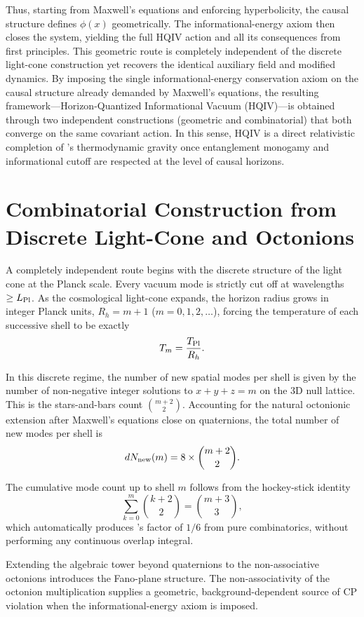 \documentclass[12pt,a4paper]{article}
\begin{document}
Thus, starting from Maxwell's equations and enforcing hyperbolicity, the causal structure defines $\phi(x)$ geometrically. The informational-energy axiom then closes the system, yielding the full HQIV action and all its consequences from first principles. This geometric route is completely independent of the discrete light-cone construction yet recovers the identical auxiliary field and modified dynamics. By imposing the single informational-energy conservation axiom on the causal structure already demanded by Maxwell's equations, the resulting framework---Horizon-Quantized Informational Vacuum (HQIV)---is obtained through two independent constructions (geometric and combinatorial) that both converge on the same covariant action. In this sense, HQIV is a direct relativistic completion of \citet{Jacobson1995}'s thermodynamic gravity once entanglement monogamy and informational cutoff are respected at the level of causal horizons.



\section{Combinatorial Construction from Discrete Light-Cone and Octonions}

A completely independent route begins with the discrete structure of the light cone at the Planck scale. Every vacuum mode is strictly cut off at wavelengths $\ge L_{\rm Pl}$. As the cosmological light-cone expands, the horizon radius grows in integer Planck units, $R_h = m + 1$ ($m = 0,1,2,\dots$), forcing the temperature of each successive shell to be exactly
\[
T_m = \frac{T_{\rm Pl}}{R_h}.
\]

In this discrete regime, the number of new spatial modes per shell is given by the number of non-negative integer solutions to $x+y+z = m$ on the 3D null lattice. This is the stars-and-bars count $\binom{m+2}{2}$. Accounting for the natural octonionic extension after Maxwell's equations close on quaternions, the total number of new modes per shell is
\[
dN_{\rm new}(m) = 8 \times \binom{m+2}{2}.
\]

The cumulative mode count up to shell $m$ follows from the hockey-stick identity
\[
\sum_{k=0}^{m} \binom{k+2}{2} = \binom{m+3}{3},
\]
which automatically produces \citet{brodie2026}'s factor of $1/6$ from pure combinatorics, without performing any continuous overlap integral.

Extending the algebraic tower beyond quaternions to the non-associative octonions introduces the Fano-plane structure. The non-associativity of the octonion multiplication supplies a geometric, background-dependent source of CP violation when the informational-energy axiom is imposed.
\end{document}
